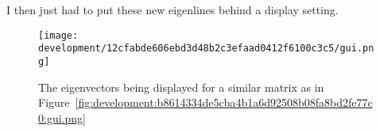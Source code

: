 \documentclass[../development.tex]{subfiles}
\begin{document}

I then just had to put these new eigenlines behind a display setting.




\begin{figure}[H]
	\centering
	\texttt{[image: development/12cfabde606ebd3d48b2c3efaad0412f6100c3c5/gui.png]}
	\caption{The eigenvectors being displayed for a similar matrix as in Figure~\ref{fig:development:b8614334de5cba4b1a6d92508b08fa8bd2fe77c0:gui.png}}
	\label{fig:development:12cfabde606ebd3d48b2c3efaad0412f6100c3c5:gui.png}
\end{figure}
\end{document}
